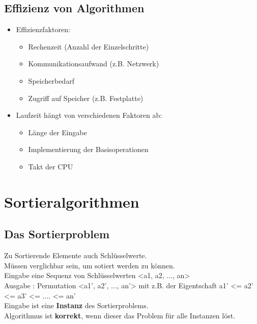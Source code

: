 \documentclass[jou,apacite]{apa6}
\begin{document}
\subsection{Effizienz von Algorithmen}
\begin{itemize}
    \item Effizienzfaktoren: 
    \begin{itemize}
        \item Rechenzeit (Anzahl der Einzelschritte)
        \item Kommunikationsaufwand (z.B. Netzwerk)
        \item Speicherbedarf
        \item Zugriff auf Speicher (z.B. Festplatte)
    \end{itemize}
    
    \item Laufzeit hängt von verschiedenen Faktoren ab:
    \begin{itemize}
        \item Länge der Eingabe
        \item Implementierung der Basisoperationen
        \item Takt der CPU
    \end{itemize}

\end{itemize}
    
\section{Sortieralgorithmen}

\subsection{Das Sortierproblem}
Zu Sortierende Elemente auch Schlüsselwerte. \\
Müssen verglichbar sein, um sotiert werden zu können. \\
Eingabe eine Sequenz von Schlüsselwerten <a1, a2, ..., an> \\
Ausgabe : Permutation <a1', a2’, ..., an’> mit z.B. der Eigentschaft a1’ <= a2’ <= a3’ <= .... <= an’ \\
Eingabe ist eine {\bfseries Instanz} des Sortierproblems. \\
Algorithmus ist {\bfseries korrekt}, wenn dieser das Problem für alle Instanzen löst.
\end{document}
